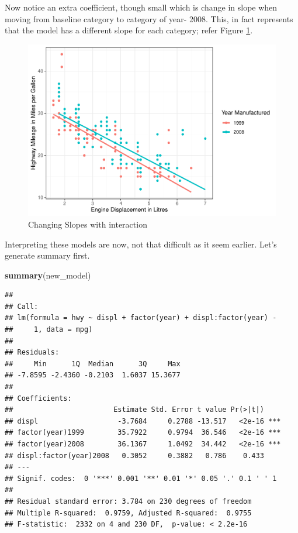 \documentclass[
]{book}
\newenvironment{Shaded}{\begin{snugshade}}{\end{snugshade}}
\newcommand{\FunctionTok}[1]{\textcolor[rgb]{0.13,0.29,0.53}{\textbf{#1}}}
\newcommand{\NormalTok}[1]{#1}
\begin{document}
Now notice an extra coefficient, though small which is change in slope when moving from baseline category to category of year- 2008. This, in fact represents that the model has a different slope for each category; refer Figure \ref{fig:parrslop3}.

\begin{figure}

{\centering \includegraphics[width=0.95\linewidth,height=0.35\textheight]{DauR_files/figure-latex/parrslop3-1} 

}

\caption{Changing Slopes with interaction}\label{fig:parrslop3}
\end{figure}

Interpreting these models are now, not that difficult as it seem earlier. Let's generate summary first.

\begin{Shaded}
\begin{Highlighting}[]
\FunctionTok{summary}\NormalTok{(new\_model)}
\end{Highlighting}
\end{Shaded}

\begin{verbatim}
## 
## Call:
## lm(formula = hwy ~ displ + factor(year) + displ:factor(year) - 
##     1, data = mpg)
## 
## Residuals:
##     Min      1Q  Median      3Q     Max 
## -7.8595 -2.4360 -0.2103  1.6037 15.3677 
## 
## Coefficients:
##                        Estimate Std. Error t value Pr(>|t|)    
## displ                   -3.7684     0.2788 -13.517   <2e-16 ***
## factor(year)1999        35.7922     0.9794  36.546   <2e-16 ***
## factor(year)2008        36.1367     1.0492  34.442   <2e-16 ***
## displ:factor(year)2008   0.3052     0.3882   0.786    0.433    
## ---
## Signif. codes:  0 '***' 0.001 '**' 0.01 '*' 0.05 '.' 0.1 ' ' 1
## 
## Residual standard error: 3.784 on 230 degrees of freedom
## Multiple R-squared:  0.9759, Adjusted R-squared:  0.9755 
## F-statistic:  2332 on 4 and 230 DF,  p-value: < 2.2e-16
\end{verbatim}
\end{document}
